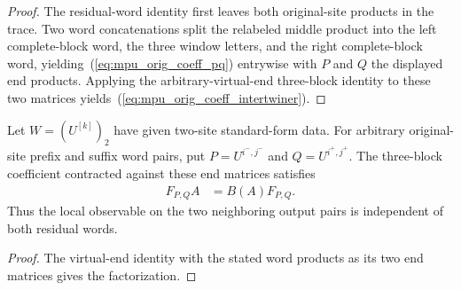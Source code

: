 \begin{proof}\leanok
    The residual-word identity first leaves both original-site products
    in the trace. Two word concatenations split the relabeled middle
    product into the left complete-block word, the three window letters,
    and the right complete-block word, yielding~(\ref{eq:mpu_orig_coeff_pq})
    entrywise with $P$ and $Q$ the displayed end products. Applying the
    arbitrary-virtual-end three-block identity to these two matrices yields~(\ref{eq:mpu_orig_coeff_intertwiner}).
\end{proof}

\begin{lemma}
    \label{lem:mpu_two_site_original_residual_locality}
    \leanok
    Let $W=(U^{[k]})_2$ have given two-site standard-form data. For
    arbitrary original-site prefix and suffix word pairs, put
    $P=U^{i^-,j^-}$ and $Q=U^{i^+,j^+}$. The three-block coefficient
    contracted against these end matrices satisfies
    \begin{align}
        F_{P,Q}A & =B(A)F_{P,Q}.
    \end{align}
    Thus the local observable on the two neighboring output pairs is
    independent of both residual words.
\end{lemma}

\begin{proof}\leanok
    The virtual-end identity with the stated word products as its
    two end matrices gives the factorization.
\end{proof}

